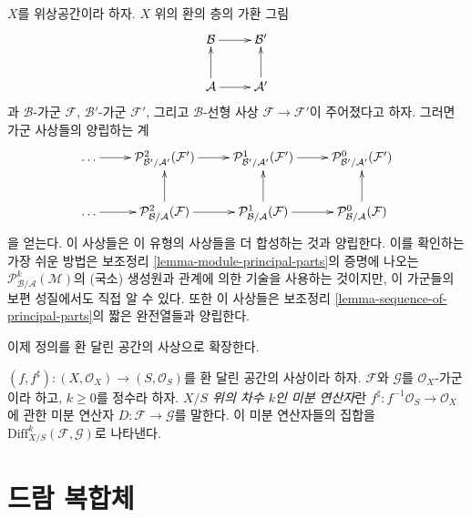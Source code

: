 \begin{remark}
\label{remark-functoriality-principal-parts}
$X$를 위상공간이라 하자. $X$ 위의 환의 층의 가환 그림
$$
\xymatrix{
\mathcal{B} \ar[r] & \mathcal{B}' \\
\mathcal{A} \ar[u] \ar[r] & \mathcal{A}' \ar[u]
}
$$
과 $\mathcal{B}$-가군 $\mathcal{F}$, $\mathcal{B}'$-가군
$\mathcal{F}'$, 그리고 $\mathcal{B}$-선형 사상
$\mathcal{F} \to \mathcal{F}'$이 주어졌다고 하자.
그러면 가군 사상들의 양립하는 계
$$
\xymatrix{
\ldots \ar[r] &
\mathcal{P}^2_{\mathcal{B}'/\mathcal{A}'}(\mathcal{F}') \ar[r] &
\mathcal{P}^1_{\mathcal{B}'/\mathcal{A}'}(\mathcal{F}') \ar[r] &
\mathcal{P}^0_{\mathcal{B}'/\mathcal{A}'}(\mathcal{F}') \\
\ldots \ar[r] &
\mathcal{P}^2_{\mathcal{B}/\mathcal{A}}(\mathcal{F}) \ar[r] \ar[u] &
\mathcal{P}^1_{\mathcal{B}/\mathcal{A}}(\mathcal{F}) \ar[r] \ar[u] &
\mathcal{P}^0_{\mathcal{B}/\mathcal{A}}(\mathcal{F}) \ar[u]
}
$$
을 얻는다. 이 사상들은 이 유형의 사상들을 더 합성하는 것과 양립한다.
이를 확인하는 가장 쉬운 방법은 보조정리
\ref{lemma-module-principal-parts}의 증명에 나오는
$\mathcal{P}^k_{\mathcal{B}/\mathcal{A}}(\mathcal{M})$의 (국소) 생성원과
관계에 의한 기술을 사용하는 것이지만, 이 가군들의 보편 성질에서도
직접 알 수 있다. 또한 이 사상들은 보조정리
\ref{lemma-sequence-of-principal-parts}의 짧은 완전열들과 양립한다.
\end{remark}

\noindent
이제 정의를 환 달린 공간의 사상으로 확장한다.

\begin{definition}
\label{definition-relative-differential-operators}
$(f, f^\sharp) : (X, \mathcal{O}_X) \to (S, \mathcal{O}_S)$를
환 달린 공간의 사상이라 하자. $\mathcal{F}$와 $\mathcal{G}$를
$\mathcal{O}_X$-가군이라 하고, $k \geq 0$를 정수라 하자.
{\it $X/S$ 위의 차수 $k$인 미분 연산자}란
$f^\sharp : f^{-1}\mathcal{O}_S \to \mathcal{O}_X$에 관한 미분 연산자
$D : \mathcal{F} \to \mathcal{G}$를 말한다. 이 미분 연산자들의 집합을
$\text{Diff}^k_{X/S}(\mathcal{F}, \mathcal{G})$로 나타낸다.
\end{definition}












\section{드람 복합체}
\label{section-de-rham-complex}

